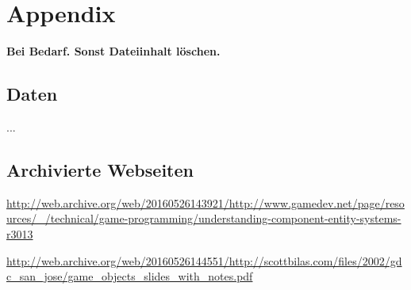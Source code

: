 

\section*{Appendix}

\textbf{Bei Bedarf. Sonst Dateiinhalt löschen.}

\subsection*{Daten}

...

\subsection*{Archivierte Webseiten}

\url{http://web.archive.org/web/20160526143921/http://www.gamedev.net/page/resources/_/technical/game-programming/understanding-component-entity-systems-r3013}

\url{http://web.archive.org/web/20160526144551/http://scottbilas.com/files/2002/gdc_san_jose/game_objects_slides_with_notes.pdf}


